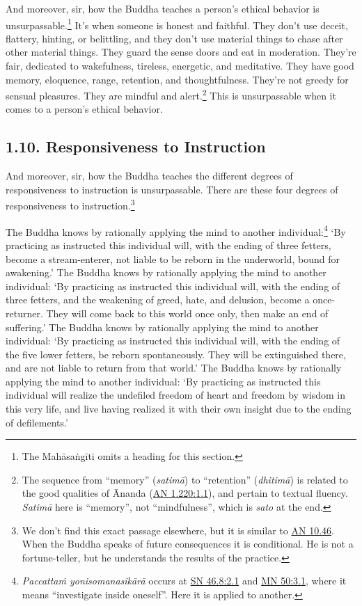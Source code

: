 \documentclass[12pt,openany]{book}%
\begin{document}
And moreover, sir, how the Buddha teaches a person’s ethical behavior is unsurpassable.\footnote{The \textsanskrit{Mahāsaṅgīti} omits a heading for this section. } It’s when someone is honest and faithful. They don’t use deceit, flattery, hinting, or belittling, and they don’t use material things to chase after other material things. They guard the sense doors and eat in moderation. They’re fair, dedicated to wakefulness, tireless, energetic, and meditative. They have good memory, eloquence, range, retention, and thoughtfulness. They’re not greedy for sensual pleasures. They are mindful and alert.\footnote{The sequence from “memory” (\textit{\textsanskrit{satimā}}) to “retention” (\textit{\textsanskrit{dhitimā}}) is related to the good qualities of Ānanda (\href{https://suttacentral.net/an1.220/en/sujato\#1.1}{AN 1.220:1.1}), and pertain to textual fluency. \textit{\textsanskrit{Satimā}} here is “memory”, not “mindfulness”, which is \textit{sato} at the end. } This is unsurpassable when it comes to a person’s ethical behavior. 

\subsection*{1.10. Responsiveness to Instruction }

And moreover, sir, how the Buddha teaches the different degrees of responsiveness to instruction is unsurpassable. There are these four degrees of responsiveness to instruction.\footnote{We don’t find this exact passage elsewhere, but it is similar to \href{https://suttacentral.net/an10.46/en/sujato}{AN 10.46}. When the Buddha speaks of future consequences it is conditional. He is not a fortune-teller, but he understands the results of the practice. } 

The Buddha knows by rationally applying the mind to another individual:\footnote{\textit{\textsanskrit{Paccattaṁ} \textsanskrit{yonisomanasikārā}} occurs at \href{https://suttacentral.net/sn46.8/en/sujato\#2.1}{SN 46.8:2.1} and \href{https://suttacentral.net/mn50/en/sujato\#3.1}{MN 50:3.1}, where it means “investigate inside oneself”. Here it is applied to another. } ‘By practicing as instructed this individual will, with the ending of three fetters, become a stream-enterer, not liable to be reborn in the underworld, bound for awakening.’ The Buddha knows by rationally applying the mind to another individual: ‘By practicing as instructed this individual will, with the ending of three fetters, and the weakening of greed, hate, and delusion, become a once-returner. They will come back to this world once only, then make an end of suffering.’ The Buddha knows by rationally applying the mind to another individual: ‘By practicing as instructed this individual will, with the ending of the five lower fetters, be reborn spontaneously. They will be extinguished there, and are not liable to return from that world.’ The Buddha knows by rationally applying the mind to another individual: ‘By practicing as instructed this individual will realize the undefiled freedom of heart and freedom by wisdom in this very life, and live having realized it with their own insight due to the ending of defilements.’ 
\end{document}
